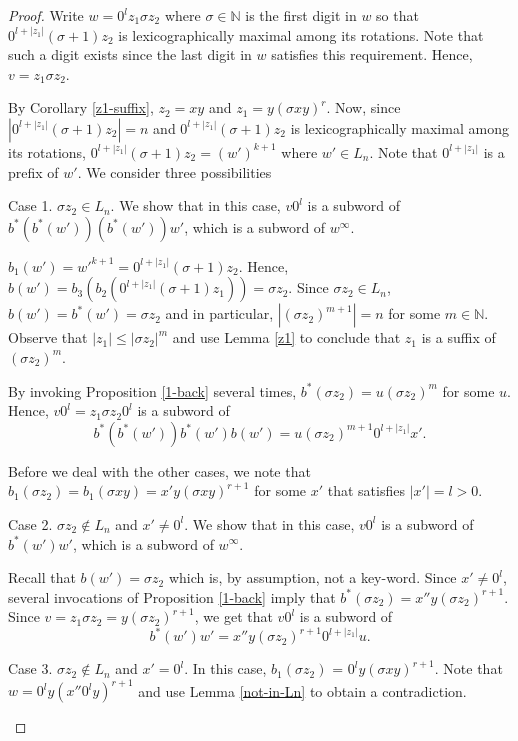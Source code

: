 \documentclass{article}
\theoremstyle{definition}
\newcommand{\N}{{\mathbb{N}}}
\begin{document}
\begin{proof}
	Write $w=0^lz_1\sigma z_2$ where $\sigma\in \N$ is the first digit in $w$ so that  $0^{l+|z_1|}(\sigma+1)z_2$ is lexicographically maximal among its rotations. Note that such a digit exists since the last digit in $w$ satisfies this requirement. Hence, $v=z_1\sigma z_2$.
	
	By Corollary \ref{z1-suffix}, $z_2=xy$ and $z_1=y(\sigma xy)^r$. Now, since $|0^{l+|z_1|}(\sigma+1)z_2|=n$ and $0^{l+|z_1|}(\sigma+1)z_2$ is lexicographically maximal among its rotations, $0^{l+|z_1|}(\sigma+1)z_2=(w')^{k+1}$ where $w'\in L_n$. Note that $0^{l+|z_1|}$ is a prefix of $w'$. We consider three possibilities
	
	\begin{description}
		
		\item{Case 1.}  $\sigma z_2\in L_n$. We show that in this case, $v0^l$ is a subword of $b^*(b^*(w'))(b^*(w'))w'$, which is a subword of $w^\infty$.
		
		$b_1(w')=w'^{k+1}=0^{l+|z_1|}(\sigma+1)z_2$. Hence, $b(w')=b_3(b_2(0^{l+|z_1|}(\sigma+1)z_1))=\sigma z_2$. Since $\sigma z_2\in L_n$, $b(w')=b^*(w')=\sigma z_2$ and in particular, $|(\sigma z_2)^{m+1}|=n$ for some $m\in \N$. Observe that $|z_1|\leq |\sigma z_2|^m$ and use Lemma \ref{z1} to conclude that $z_1$ is a suffix of $(\sigma z_2)^m$.  
		
		By invoking Proposition \ref{1-back} several times, $b^*(\sigma z_2)= u(\sigma z_2)^m$ for some $u$. Hence, $v0^l=z_1\sigma z_2 0^l$ is a subword of 
		$$b^*(b^*(w'))b^*(w')b(w')=u(\sigma z_2)^{m+1}0^{l+|z_1|}x'.$$
		
		
	\end{description}
	
	Before we deal with the other cases, we note that $b_1(\sigma z_2)=b_1(\sigma xy)=x'y(\sigma xy)^{r+1}$ for some $x'$ that satisfies $|x'|=l>0$.
	
	\begin{description}
		\item{Case 2.} $\sigma z_2\notin L_n$  and $x'\neq 0^l$. We show that in this case, $v0^l$ is a subword of $b^*(w')w'$, which is a subword of $w^\infty$.
		
		Recall that $b(w')=\sigma z_2$ which is, by assumption, not a key-word. Since $x'\neq 0^l$, several invocations of Proposition \ref{1-back} imply that $b^*(\sigma z_2)=x''y(\sigma z_2)^{r+1}$. Since $v=z_1\sigma z_2=y(\sigma z_2)^{r+1}$, we get that $v0^l$ is a subword of 
		$$b^*(w')w'=x''y(\sigma z_2)^{r+1}0^{l+|z_1|}u.$$
		
		
		\item{Case 3.} $\sigma z_2\notin L_n$  and $x'=0^l$. In this case, $b_1(\sigma z_2)$ = $0^ly(\sigma xy)^{r+1}$. Note that $w=0^ly(x''0^ly)^{r+1}$ and use Lemma \ref{not-in-Ln} to obtain a contradiction.
		
	\end{description}
	
	
\end{proof}
\end{document}
